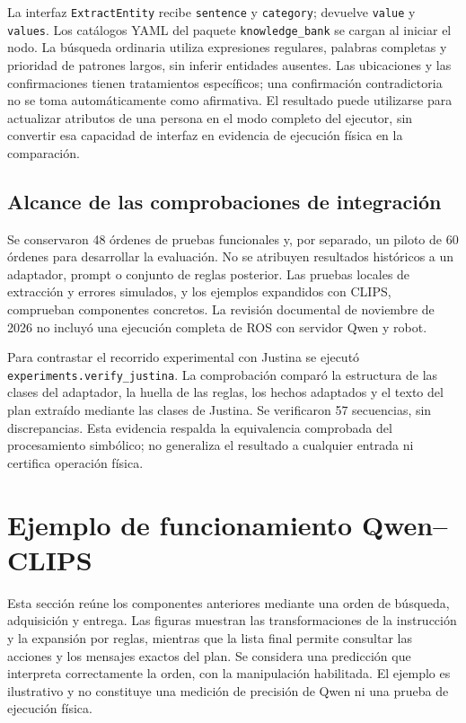 La interfaz \texttt{ExtractEntity} recibe \texttt{sentence} y
\texttt{category}; devuelve \texttt{value} y \texttt{values}.
Los catálogos YAML del paquete \texttt{knowledge\_\allowbreak bank} se cargan al
iniciar el nodo. La búsqueda ordinaria utiliza expresiones regulares,
palabras completas y prioridad de patrones largos, sin inferir entidades
ausentes. Las ubicaciones y las confirmaciones tienen tratamientos
específicos; una confirmación contradictoria no se toma automáticamente
como afirmativa. El resultado puede utilizarse para actualizar atributos
de una persona en el modo completo del ejecutor, sin convertir esa
capacidad de interfaz en evidencia de ejecución física en la comparación.

\subsection{Alcance de las comprobaciones de integración}

Se conservaron 48 órdenes de pruebas funcionales y, por separado,
un piloto de 60 órdenes para desarrollar la evaluación. No se atribuyen
resultados históricos a un adaptador, prompt o conjunto de reglas
posterior. Las pruebas locales de extracción y errores simulados,
y los ejemplos expandidos con CLIPS, comprueban componentes concretos.
La revisión documental de noviembre de 2026 no incluyó una ejecución
completa de ROS con servidor Qwen y robot.

Para contrastar el recorrido experimental con Justina se ejecutó
\texttt{experiments.\allowbreak verify\_\allowbreak justina}. La comprobación comparó
la estructura de las clases del adaptador, la huella de las reglas,
los hechos adaptados y el texto del plan extraído mediante las clases de
Justina. Se verificaron 57 secuencias, sin discrepancias. Esta evidencia
respalda la equivalencia comprobada del procesamiento simbólico; no
generaliza el resultado a cualquier entrada ni certifica operación física.

\section{Ejemplo de funcionamiento Qwen--CLIPS}
\label{sec:ejemplo_integrado_qwen_clips}
\label{subsec:ejemplo_completo_qwen_clips}

Esta sección reúne los componentes anteriores mediante una orden de
búsqueda, adquisición y entrega. Las figuras muestran las transformaciones
de la instrucción y la expansión por reglas, mientras que la lista final
permite consultar las acciones y los mensajes exactos del plan.
Se considera una predicción que interpreta correctamente la orden, con
la manipulación habilitada. El ejemplo es ilustrativo y no constituye
una medición de precisión de Qwen ni una prueba de ejecución física.

